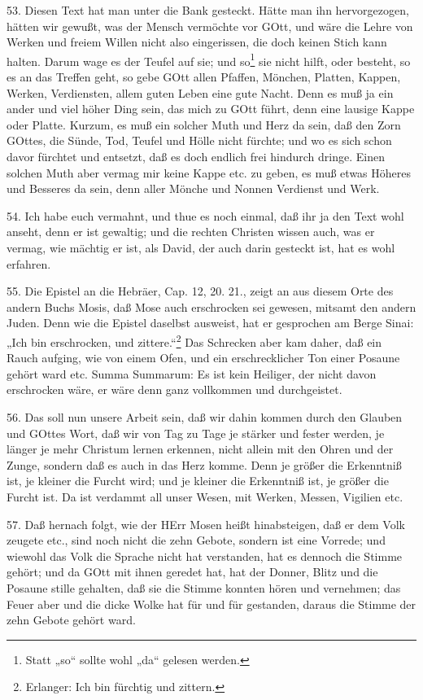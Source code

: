 53. Diesen Text hat man unter die Bank gesteckt. Hätte man ihn hervorgezogen, hätten wir gewußt, was der Mensch vermöchte vor GOtt, und wäre die Lehre von Werken und freiem Willen nicht also eingerissen, die doch keinen Stich kann halten. Darum wage es der Teufel auf sie; und so\footnote{Statt „so“ sollte wohl „da“ gelesen werden.} sie nicht hilft, oder besteht, so es an das Treffen geht, so gebe GOtt allen Pfaffen, Mönchen, Platten, Kappen, Werken, Verdiensten, allem guten Leben eine gute Nacht. Denn es muß ja ein ander und viel höher Ding sein, das mich zu GOtt führt, denn eine lausige Kappe oder Platte. Kurzum, es muß ein solcher Muth und Herz da sein, daß den Zorn GOttes, die Sünde, Tod, Teufel und Hölle nicht fürchte; und wo es sich schon davor fürchtet und entsetzt, daß es doch endlich frei hindurch dringe. Einen solchen Muth aber vermag mir keine Kappe etc. zu geben, es muß etwas Höheres und Besseres da sein, denn aller Mönche und Nonnen Verdienst und Werk.

54. Ich habe euch vermahnt, und thue es noch einmal, daß ihr ja den Text wohl anseht, denn er ist gewaltig; und die rechten Christen wissen auch, was er vermag, wie mächtig er ist, als David, der auch darin gesteckt ist, hat es wohl erfahren.

55. Die Epistel an die Hebräer, Cap. 12, 20. 21., zeigt an aus diesem Orte des andern Buchs Mosis, daß Mose auch erschrocken sei gewesen, mitsamt den andern Juden. Denn wie die Epistel daselbst ausweist, hat er gesprochen am Berge Sinai: „Ich bin erschrocken, und zittere.“\footnote{Erlanger: Ich bin fürchtig und zittern.} Das Schrecken aber kam daher, daß ein Rauch aufging, wie von einem Ofen, und ein erschrecklicher Ton einer Posaune gehört ward etc. Summa Summarum: Es ist kein Heiliger, der nicht davon erschrocken wäre, er wäre denn ganz vollkommen und durchgeistet.

56. Das soll nun unsere Arbeit sein, daß wir dahin kommen durch den Glauben und GOttes Wort, daß wir von Tag zu Tage je stärker und fester werden, je länger je mehr Christum lernen erkennen, nicht allein mit den Ohren und der Zunge, sondern daß es auch in das Herz komme. Denn je größer die Erkenntniß ist, je kleiner die Furcht wird; und je kleiner die Erkenntniß ist, je größer die Furcht ist. Da ist verdammt all unser Wesen, mit Werken, Messen, Vigilien etc.

57. Daß hernach folgt, wie der HErr Mosen heißt hinabsteigen, daß er dem Volk zeugete etc., sind noch nicht die zehn Gebote, sondern ist eine Vorrede; und wiewohl das Volk die Sprache nicht hat verstanden, hat es dennoch die Stimme gehört; und da GOtt mit ihnen geredet hat, hat der Donner, Blitz und die Posaune stille gehalten, daß sie die Stimme konnten hören und vernehmen; das Feuer aber und die dicke Wolke hat für und für gestanden, daraus die Stimme der zehn Gebote gehört ward.

